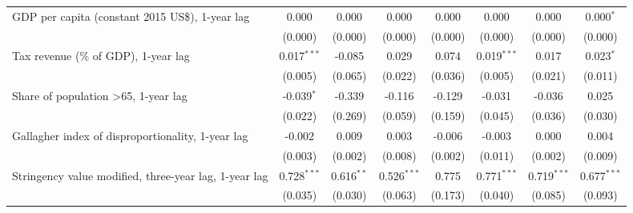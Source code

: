 \begin{table}[htbp]
\begin{tabular}{lccccccc}
      GDP per capita (constant 2015 US\$), 1-year lag                                          & 0.000          & 0.000                     & 0.000          & 0.000            & 0.000           & 0.000           & 0.000$^{*}$\\   
                                                                                               & (0.000)        & (0.000)                   & (0.000)        & (0.000)          & (0.000)         & (0.000)         & (0.000)\\   
      Tax revenue (\% of GDP), 1-year lag                                                      & 0.017$^{***}$  & -0.085                    & 0.029          & 0.074            & 0.019$^{***}$   & 0.017           & 0.023$^{*}$\\   
                                                                                               & (0.005)        & (0.065)                   & (0.022)        & (0.036)          & (0.005)         & (0.021)         & (0.011)\\   
      Share of population >65, 1-year lag                                                      & -0.039$^{*}$   & -0.339                    & -0.116         & -0.129           & -0.031          & -0.036          & 0.025\\   
                                                                                               & (0.022)        & (0.269)                   & (0.059)        & (0.159)          & (0.045)         & (0.036)         & (0.030)\\   
      Gallagher index of disproportionality, 1-year lag                                        & -0.002         & 0.009                     & 0.003          & -0.006           & -0.003          & 0.000           & 0.004\\   
                                                                                               & (0.003)        & (0.002)                   & (0.008)        & (0.002)          & (0.011)         & (0.002)         & (0.009)\\   
      Stringency value modified, three-year lag, 1-year lag                                    & 0.728$^{***}$  & 0.616$^{**}$              & 0.526$^{***}$  & 0.775            & 0.771$^{***}$   & 0.719$^{***}$   & 0.677$^{***}$\\   
                                                                                               & (0.035)        & (0.030)                   & (0.063)        & (0.173)          & (0.040)         & (0.085)         & (0.093)\\   

\end{tabular}
\end{table}
